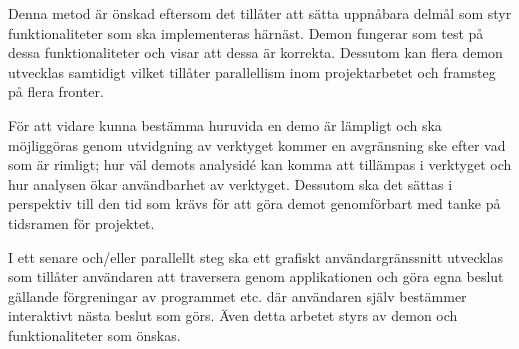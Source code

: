 Denna metod är önskad eftersom det tillåter att sätta uppnåbara delmål som styr
funktionaliteter som ska implementeras härnäst. Demon fungerar som test på dessa
funktionaliteter och visar att dessa är korrekta. Dessutom kan flera demon
utvecklas samtidigt vilket tillåter parallellism inom projektarbetet och
framsteg på flera fronter.

För att vidare kunna bestämma huruvida en demo är lämpligt och ska möjliggöras
genom utvidgning av verktyget kommer en avgränsning ske efter vad som är rimligt;
hur väl demots analysidé kan komma att tillämpas i verktyget och hur analysen
ökar användbarhet av verktyget. Dessutom ska det sättas i perspektiv till den tid
som krävs för att göra demot genomförbart med tanke på tidsramen för projektet.

I ett senare och/eller parallellt steg ska ett grafiskt användargränssnitt
utvecklas som tillåter användaren att traversera genom applikationen och göra
egna beslut gällande förgreningar av programmet etc. där användaren själv
bestämmer interaktivt nästa beslut som görs. Även detta arbetet styrs av demon
och funktionaliteter som önskas.




%
